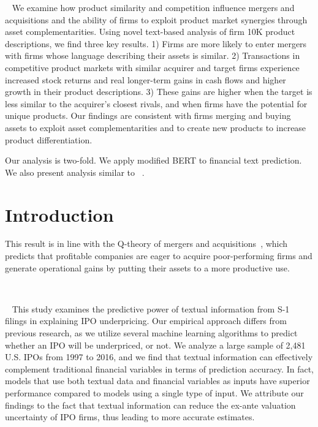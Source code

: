 \documentclass[11pt]{article}
\begin{document}
~\cite{hoberg2010}
We examine how product similarity and competition influence mergers and
acquisitions and the ability of firms to exploit product market synergies through
asset complementarities. Using novel text-based analysis of firm 10K product
descriptions, we find three key results. 1) Firms are more likely to enter
mergers with firms whose language describing their assets is similar. 2) Transactions in competitive product markets with similar acquirer and target firms
experience increased stock returns and real longer-term gains in cash flows and
higher growth in their product descriptions. 3) These gains are higher when
the target is less similar to the acquirer’s closest rivals, and when firms have the
potential for unique products. Our findings are consistent with firms merging
and buying assets to exploit asset complementarities and to create new
products to increase product differentiation.

Our analysis is two-fold. We apply modified BERT to financial text
prediction. We also present analysis similar to ~\cite{moriarty2019}.




\section{Introduction}


This result is in line with the Q-theory of mergers and acquisitions~\cite{jovanovic2002}, which
predicts that profitable companies are eager to acquire poor-performing firms and generate
operational gains by putting their assets to a more productive use.


~\cite{katsafados2019}


~\cite{katsafados2020}
This study examines the predictive power of textual information from S-1 filings in
explaining IPO underpricing. Our empirical approach differs from previous research, as we
utilize several machine learning algorithms to predict whether an IPO will be underpriced, or
not. We analyze a large sample of 2,481 U.S. IPOs from 1997 to 2016, and we find that
textual information can effectively complement traditional financial variables in terms of
prediction accuracy. In fact, models that use both textual data and financial variables as
inputs have superior performance compared to models using a single type of input. We
attribute our findings to the fact that textual information can reduce the ex-ante valuation
uncertainty of IPO firms, thus leading to more accurate estimates.
\end{document}
